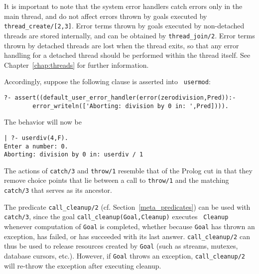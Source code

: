 It is important to note that the system error handlers catch errors
only in the main thread, and do not affect errors thrown by goals
executed by {\tt thread\_create/[2,3]}.  Error terms thrown by goals
executed by non-detached threads are stored internally, and can be
obtained by {\tt thread\_join/2}.  Error terms thrown by detached
threads are lost when the thread exits, so that any error handling for
a detached thread should be performed within the thread itself.  See
Chapter~\ref{chap:threads} for further information.

Accordingly, suppose the following clause is asserted into {\tt
usermod}:
%
\begin{small}
\begin{verbatim}
?- assert((default_user_error_handler(error(zerodivision,Pred)):- 
        error_writeln(['Aborting: division by 0 in: ',Pred]))).
\end{verbatim}
\end{small}
%
The behavior will now be
\begin{small}
\begin{verbatim}
| ?- userdiv(4,F).
Enter a number: 0.
Aborting: division by 0 in: userdiv / 1
\end{verbatim}
\end{small}
The actions of {\tt catch/3} and {\tt throw/1} resemble that of the
Prolog cut in that they remove choice points that lie between a call
to {\tt throw/1} and the matching {\tt catch/3} that serves as its
ancestor. 


The predicate {\tt call\_cleanup/2}
(cf. Section~\ref{meta_predicates}) can be used with {\tt catch/3},
since the goal {\tt call\_cleanup(Goal,Cleanup)} executes {\tt
  Cleanup} whenever computation of {\tt Goal} is completed, whether
because {\tt Goal} has thrown an exception, has failed, or has
succeeded with its last answer.  {\tt call\_cleanup/2} can thus be
used to release resources created by {\tt Goal} (such as streams,
mutexes, database cursors, etc.).  However, if {\tt Goal} throws an
exception, {\tt call\_cleanup/2} will re-throw the exception after
executing cleanup.

